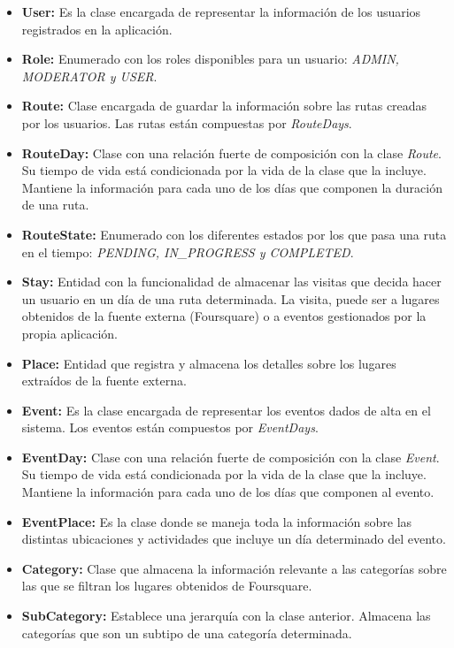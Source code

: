 \begin{itemize}
	\item \textbf{User: } Es la clase encargada de representar la información de los usuarios registrados en la aplicación.
	\item \textbf{Role: } Enumerado con los roles disponibles para un usuario: \textit{ADMIN, MODERATOR y USER}.
	\item \textbf{Route: } Clase encargada de guardar la información sobre las rutas creadas por los usuarios. Las rutas están compuestas por \textit{RouteDays}.
	\item \textbf{RouteDay: } Clase con una relación fuerte de composición con la clase \textit{Route}. Su tiempo de vida está condicionada por la vida de la clase que la incluye. Mantiene la información para cada uno de los días que componen la duración de una ruta.
	\item \textbf{RouteState: } Enumerado con los diferentes estados por los que pasa una ruta en el tiempo: \textit{PENDING, IN\_PROGRESS y COMPLETED}.
	\item \textbf{Stay: } Entidad con la funcionalidad de almacenar las visitas que decida hacer un usuario en un día de una ruta determinada. La visita, puede ser a lugares obtenidos de la fuente externa (Foursquare) o a eventos gestionados por la propia aplicación.
	\item \textbf{Place: } Entidad que registra y almacena los detalles sobre los lugares extraídos de la fuente externa.
	\item \textbf{Event: } Es la clase encargada de representar los eventos dados de alta en el sistema. Los eventos están compuestos por \textit{EventDays}.
	\item \textbf{EventDay: } Clase con una relación fuerte de composición con la clase \textit{Event}. Su tiempo de vida está condicionada por la vida de la clase que la incluye. Mantiene la información para cada uno de los días que componen al evento.
	\item \textbf{EventPlace: } Es la clase donde se maneja toda la información sobre las distintas ubicaciones y actividades que incluye un día determinado del evento.
	\item \textbf{Category: } Clase que almacena la información relevante a las categorías sobre las que se filtran los lugares obtenidos de Foursquare.
	\item \textbf{SubCategory: } Establece una jerarquía con la clase anterior. Almacena las categorías que son un subtipo de una categoría determinada.
\end{itemize}



